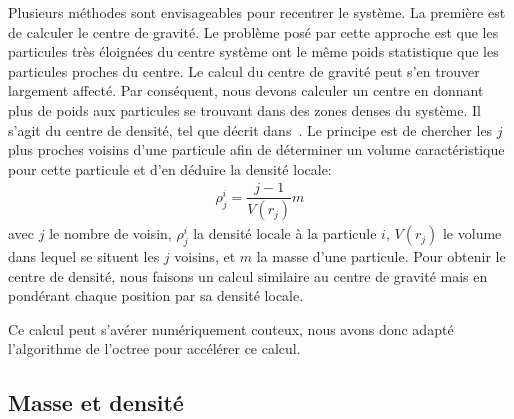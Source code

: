 
			Plusieurs méthodes sont envisageables pour recentrer le système. La première est de calculer le
			centre de gravité. Le problème posé par cette approche est que les particules très éloignées du
			centre système ont le même poids statistique que les particules proches du centre.
			Le calcul du centre de gravité peut s'en trouver largement affecté.
			Par conséquent, nous devons calculer un centre en donnant plus de poids aux
			particules se trouvant dans des zones denses du système. Il s'agit du \og centre de densité\fg,
			tel que décrit dans~\citet{1985ApJ...298...80C}. Le principe est de chercher les $j$ plus
			proches voisins d'une particule afin de déterminer un volume caractéristique pour cette particule et d'en déduire la densité
			locale:
			\begin{align}
				\rho_j^i = \dfrac{j-1}{V(r_j)}m
			\end{align}
			avec $j$ le nombre de voisin, $\rho_j^i$ la densité locale à la particule $i$, $V(r_j)$ le volume
			dans lequel se situent les $j$ voisins, et $m$ la masse d'une particule. Pour obtenir le centre
			de densité,
			nous faisons un calcul similaire au centre de gravité mais en pondérant chaque position par sa densité locale.

			Ce calcul peut s'avérer numériquement couteux, nous avons  donc adapté l'algorithme de l'octree
			pour accélérer ce calcul.

		\subsection{Masse et densité}

